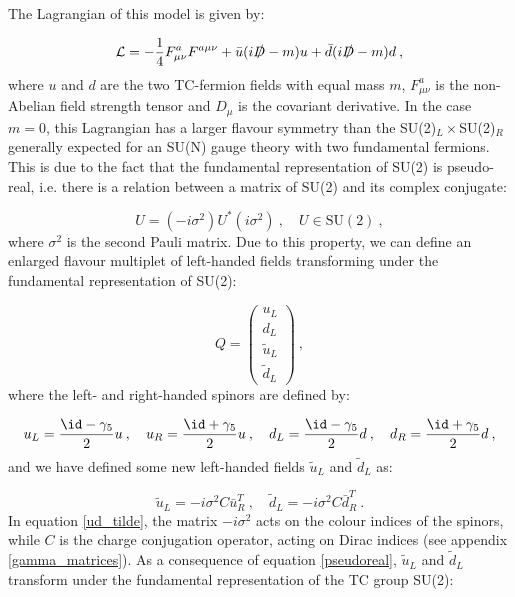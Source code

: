 The Lagrangian of this model is given by:

\begin{equation}
\mathcal L = - \frac{1}{4} F_{\mu\nu}^a F^{a\mu\nu}  + \bar u (i \slashed D - m) u + \bar d (i \slashed D - m) d \: ,
\label{SU2_Lagrangian}
\end{equation}
%
where $u$ and $d$ are the two TC-fermion fields with equal mass $m$, $F_{\mu\nu}^a$ is the non-Abelian field strength tensor and $D_{\mu}$ is the covariant derivative. In the case $m=0$, this Lagrangian has a larger flavour symmetry than the SU(2)$_L \times$SU(2)$_R$ generally expected for an SU(N) gauge theory with two fundamental fermions. This is due to the fact that the fundamental representation of SU(2) is pseudo-real, i.e. there is a relation between a matrix of SU(2) and its complex conjugate:

\begin{equation}
U = (-i \sigma^2) U^* (i \sigma^2) \: , \quad U \in\mathrm{ SU}(2) \: ,
\label{pseudoreal}
\end{equation}
%
where $\sigma^2$ is the second Pauli matrix.
Due to this property, we can define an enlarged flavour multiplet of left-handed fields transforming under the fundamental representation of SU(2):

\begin{equation}
Q = 
\begin{pmatrix}
u_L \\
d_L \\
\tilde u_L \\
\tilde d_L
\end{pmatrix} \: , 
\end{equation}
%
where the left- and right-handed spinors are defined by: 

\begin{equation}
u_L = \frac{\id - \gamma_5}{2}u \: ,  \quad u_R = \frac{\id + \gamma_5}{2}u \: , \quad  d_L = \frac{\id - \gamma_5}{2}d \: ,  \quad d_R = \frac{\id + \gamma_5}{2}d \: ,
\end{equation}
%
and we have defined some new left-handed fields $\tilde u_L$ and $\tilde d_L$ as:

\begin{equation}
\tilde u_L = -i \sigma^2 C \bar u_R^T \: , \quad \tilde d_L = -i \sigma^2 C \bar d_R^T \: .
\label{ud_tilde}
\end{equation}
%
In equation \ref{ud_tilde}, the matrix $-i \sigma^2$ acts on the colour indices of the spinors, while $C$ is the charge conjugation operator, acting on Dirac indices (see appendix \ref{gamma_matrices}). As a consequence of equation \ref{pseudoreal}, $\tilde u_L$ and $\tilde d_L$ transform under the fundamental representation of the TC group SU(2):


